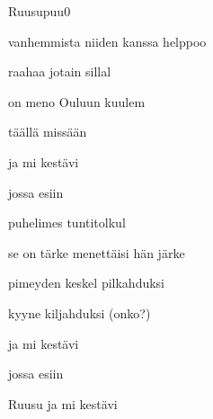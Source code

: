 \documentclass[12pt,a4paper]{article}
\begin{document}
\thispagestyle{empty}
\begin{mysong}{Ruusupuu}{0}


\begin{SBVerse}
 vanhemmista   niiden kanssa helppoo

 raahaa jotain  
sillal

 on meno  Ouluun kuulem

 täällä   missään 
\end{SBVerse}

\begin{SBChorus}
 ja mi 
 kestävi 

 jossa  
 esiin  
\end{SBChorus}

\begin{SBVerse*}
  
\end{SBVerse*}

\begin{SBVerse}
 puhelimes  tuntitolkul

 se on tärke  menettäisi hän
järke

 pimeyden keskel  pilkahduksi

 kyyne  kiljahduksi (onko?)
\end{SBVerse}

\begin{SBChorus}
 ja mi 
 kestävi 

 jossa  
 esiin  

Ruusu ja mi  
kestävi 


\end{SBChorus}
\end{mysong}
\end{document}
